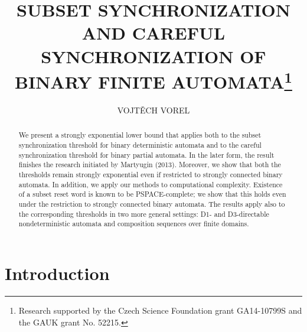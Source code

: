 \documentclass{ws-ijmpc}
\begin{document}
\title{\uppercase{Subset Synchronization and Careful Synchronization of Binary Finite Automata}\footnote{Research supported by the Czech Science Foundation grant GA14-10799S and the GAUK grant No. 52215.}}

\author{\uppercase{Vojt\v{e}ch Vorel}}
\address{Department of Theoretical Computer Science and Mathematical Logic,\\
Charles University,\\ Malostransk\'{e} n\'{a}m. 25, Prague, Czech Republic\\ vorel@ktiml.mff.cuni.cz}

\maketitle

\begin{abstract} We present a strongly exponential lower bound that applies both to the subset synchronization threshold for binary deterministic automata and to the careful synchronization threshold for binary partial automata. In the later form, the result finishes the research initiated by Martyugin (2013). Moreover, we show that both the thresholds remain strongly exponential even if restricted to strongly connected binary automata. In addition, we apply our methods to computational complexity. Existence of a subset reset word is known to be  PSPACE-complete; we show that this holds even under the restriction to strongly connected binary automata. The results apply also to the corresponding thresholds in two more general settings: D1- and D3-directable nondeterministic automata and composition sequences over finite domains.
 \end{abstract}



\section{Introduction}
\end{document}
